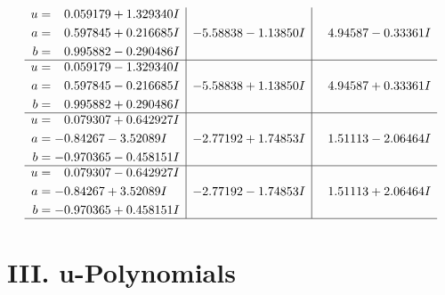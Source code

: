 \documentclass[1p]{elsarticle_modified}
\theoremstyle{definition}
\begin{document}
$$\begin{array}{c|c|c}
\begin{aligned}
u &= \phantom{-}0.059179 + 1.329340 I \\
a &= \phantom{-}0.597845 + 0.216685 I \\
b &= \phantom{-}0.995882 - 0.290486 I\end{aligned}
 & -5.58838 - 1.13850 I & \phantom{-}4.94587 - 0.33361 I \\ \hline\begin{aligned}
u &= \phantom{-}0.059179 - 1.329340 I \\
a &= \phantom{-}0.597845 - 0.216685 I \\
b &= \phantom{-}0.995882 + 0.290486 I\end{aligned}
 & -5.58838 + 1.13850 I & \phantom{-}4.94587 + 0.33361 I \\ \hline\begin{aligned}
u &= \phantom{-}0.079307 + 0.642927 I \\
a &= -0.84267 - 3.52089 I \\
b &= -0.970365 - 0.458151 I\end{aligned}
 & -2.77192 + 1.74853 I & \phantom{-}1.51113 - 2.06464 I \\ \hline\begin{aligned}
u &= \phantom{-}0.079307 - 0.642927 I \\
a &= -0.84267 + 3.52089 I \\
b &= -0.970365 + 0.458151 I\end{aligned}
 & -2.77192 - 1.74853 I & \phantom{-}1.51113 + 2.06464 I\\
 \hline 
 \end{array}$$\newpage
\newpage\renewcommand{\arraystretch}{1}
\centering \section*{ III. u-Polynomials}
\end{document}
